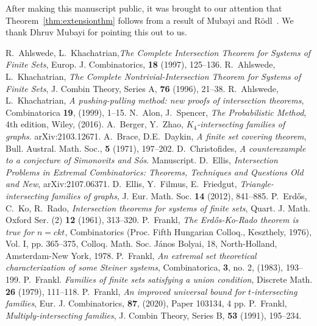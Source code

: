 \documentclass[12pt]{article}
\theoremstyle{definition}
\begin{document}
After making this manuscript public, it was brought to our attention that  Theorem~\ref{thm:extensionthm} follows from a result of Mubayi and R\"{o}dl~\cite[Theorem 15]{MR}. We thank Dhruv Mubayi for pointing this out to us. 


\begin{thebibliography}{}
R.~Ahlswede, L.~Khachatrian,\emph{The Complete Intersection Theorem for Systems of Finite Sets}, Europ. J. Combinatorics, {\bf 18} (1997), 125--136.
R.~Ahlswede, L.~Khachatrian, \emph{The Complete Nontrivial-Intersection Theorem for Systems of Finite Sets}, J. Combin Theory, Series A, {\bf 76} (1996), 21--38.
R.~Ahlswede, L.~Khachatrian, \emph{A pushing-pulling method: new proofs of intersection theorems}, Combinatorica {\bf 19}, (1999), 1--15. 
N.~Alon, J.~Spencer, \emph{The Probabilistic Method}, 4th edition, Wiley, (2016). 
A.~Berger, Y.~Zhao, \emph{$K_4$-intersecting families of graphs}. arXiv:2103.12671. 
A.~Brace, D.E.~Daykin, \emph{A finite set covering theorem}, Bull. Austral. Math. Soc., {\bf 5} (1971), 197--202. 
D.~Christofides, \emph{A counterexample to a conjecture of Simonovits and S\'os}. Manuscript. 
D.~Ellis, \emph{Intersection Problems in Extremal Combinatorics: Theorems, Techniques and Questions Old and New}, arXiv:2107.06371. 
D.~Ellis, Y.~Filmus, E.~Friedgut, \emph{Triangle-intersecting families of graphs}, J. Eur. Math. Soc. {\bf 14} (2012), 841--885. 
P.~Erd\H{o}s, C.~Ko, R.~Rado, \emph{Intersection theorems for systems of finite sets}, Quart. J. Math. Oxford Ser. (2) {\bf 12} (1961), 313--320.
P.~Frankl, \emph{The Erd\H{o}s-Ko-Rado theorem is true for $n=ckt$}, Combinatorics (Proc. Fifth Hungarian Colloq., Keszthely, 1976), Vol. I, pp. 365–375,
Colloq. Math. Soc. J\'anos Bolyai, 18, North-Holland, Amsterdam-New York, 1978.
P.~Frankl, \emph{An extremal set theoretical characterization of some Steiner systems}, Combinatorica, {\bf 3}, no. 2, (1983), 193--199. 
P.~Frankl. \emph{Families of finite sets satisfying a union condition}, Discrete Math. {\bf 26} (1979), 111--118.
P.~Frankl, \emph{An improved universal bound for $t$-intersecting families}, Eur. J. Combinatorics, {\bf 87}, (2020), Paper 103134, 4 pp. 
P.~Frankl, \emph{Multiply-intersecting families}, J. Combin Theory, Series B, {\bf 53} (1991), 195--234. 

\end{thebibliography}
\end{document}

